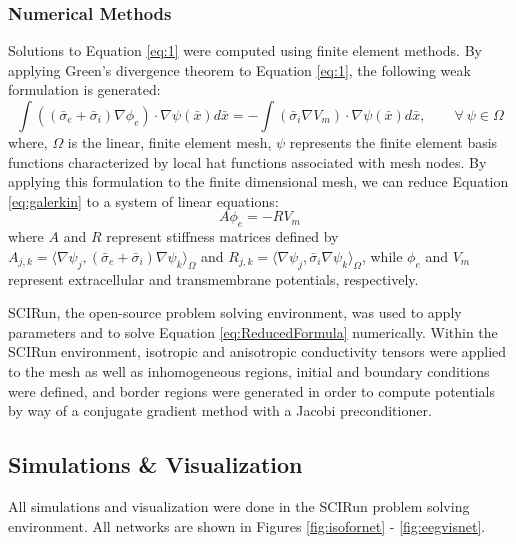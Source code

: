 \subsubsection{Numerical Methods}
\label{sec:numerical}


Solutions to Equation \ref{eq:1} were computed using finite element methods.  By applying 
Green's divergence theorem to Equation \ref{eq:1}, the following weak formulation is generated:
\begin{equation}
\int ((\bar{\sigma}_e + \bar{\sigma}_i)\nabla \phi_e) \cdot \nabla \psi(\bar{x})d\bar{x} = - \int (\bar{\sigma}
_i \nabla V_m)\cdot \nabla \psi(\bar{x})d\bar{x}, \quad \quad \forall \ \psi \in \Omega
\label{eq:galerkin}
\end{equation}
where, $\Omega$ is the linear, finite element mesh, $\psi$ represents the finite element basis functions characterized by local hat functions associated with mesh nodes. By applying this formulation to the finite dimensional mesh, we can reduce Equation \ref{eq:galerkin} to a system of linear equations:
\begin{equation}
A \phi_e = -RV_m
\label{eq:ReducedFormula}
\end{equation}
where $A$ and $R$ represent stiffness matrices defined by $A_{j,k} = \langle \nabla \psi_j,(\bar{\sigma}
_e + \bar{\sigma}_i)\nabla \psi_k \rangle_\Omega$ and $R_{j,k} = \langle \nabla \psi_j,\bar{\sigma}_i
\nabla \psi_k \rangle_\Omega$,
while $\phi_e$ and $V_m$ represent extracellular and transmembrane potentials, respectively.\cite{ref:fem}

SCIRun, the open-source problem solving environment, was used to apply parameters and to solve Equation  \ref{eq:ReducedFormula} numerically.  Within the SCIRun environment, isotropic and anisotropic conductivity tensors were applied to the mesh as well as inhomogeneous regions, initial and boundary conditions were defined, and border regions were generated in order to compute potentials by way of a conjugate gradient method with a Jacobi preconditioner.

\subsection{Simulations \& Visualization}
\label{sec:sim}

All simulations and visualization were done in the SCIRun problem solving environment. All networks are shown in Figures \ref{fig:isofornet} - \ref{fig:eegvisnet}.

